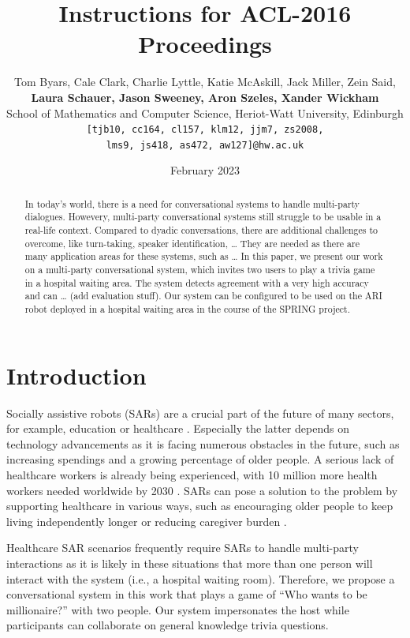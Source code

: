 \documentclass[hidelinks, 11pt]{article}
\title{Instructions for ACL-2016 Proceedings}
\author{Tom Byars, Cale Clark, Charlie Lyttle, Katie McAskill, Jack Miller, Zein Said, \\
{\bf Laura Schauer, Jason Sweeney, Aron Szeles, Xander Wickham} \\
School of Mathematics and Computer Science, Heriot-Watt University, Edinburgh \\ {\tt {[tjb10, cc164, cl157, klm12, jjm7, zs2008,}} \\ {\tt {lms9, js418, as472, aw127]}@hw.ac.uk}}
\date{February 2023}
\begin{document}
\maketitle

\begin{abstract}
  In today's world, there is a need for conversational systems to handle multi-party dialogues. Howevery, multi-party conversational systems still struggle to be usable in a real-life context. Compared to dyadic conversations, there are additional challenges to overcome, like turn-taking, speaker identification, … They are needed as there are many application areas for these systems, such as …  In this paper, we present our work on a multi-party conversational system, which invites two users to play a trivia game in a hospital waiting area. The system detects agreement with a very high accuracy and can … (add evaluation stuff). Our system can be configured to be used on the ARI robot deployed in a hospital waiting area in the course of the SPRING project.
\end{abstract}


\section{Introduction}
\label{sec:introduction}

Socially assistive robots (SARs) are a crucial part of the future of many sectors, for example, education or healthcare \cite{gunson_visually_aware_2022}. Especially the latter depends on technology advancements as it is facing numerous obstacles in the future, such as increasing spendings and a growing percentage of older people. A serious lack of healthcare workers is already being experienced, with 10 million more health workers needed worldwide by 2030 \cite{cooper_ari_2020,Health_workforce_2023}. SARs can pose a solution to the problem by supporting healthcare in various ways, such as encouraging older people to keep living independently longer or reducing caregiver burden \cite{cooper_ari_2020}.

Healthcare SAR scenarios frequently require SARs to handle multi-party interactions as it is likely in these situations that more than one person will interact with the system (i.e., a hospital waiting room). Therefore, we propose a conversational system in this work that plays a game of ``Who wants to be millionaire?'' with two people. Our system impersonates the host while participants can collaborate on general knowledge trivia questions.
\end{document}
